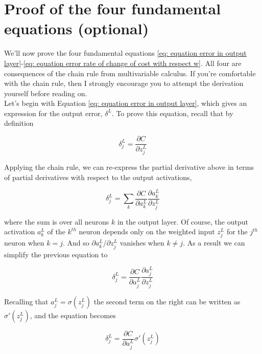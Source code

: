 \section{Proof of the four fundamental equations (optional)}
\label{sec: Proof of the four fundamental equations (optional)}

We'll now prove the four fundamental equations \ref{eq: equation error in output layer}-\ref{eq: equation error rate of change of cost with respect w}. All four are consequences of the chain rule from multivariable calculus. If you're comfortable with the chain rule, then I strongly encourage you to attempt the derivation yourself before reading on.\\

Let's begin with Equation \ref{eq: equation error in output layer}, which gives an expression for the output error, $\delta^L$. To prove this equation, recall that by definition

\begin{equation}
\delta^L_j=\frac{\partial C}{\partial z^L_j}
\label{eq: proof bp1 start definition}
\end{equation}

Applying the chain rule, we can re-express the partial derivative above in terms of partial derivatives with respect to the output activations,

\begin{equation}
\delta^L_j=\sum_k\frac{\partial C}{\partial a^L_k}\frac{\partial a^L_k}{\partial z^L_j}
\label{eq: proof bp1 chain rule}
\end{equation}

where the sum is over all neurons $k$ in the output layer. Of course, the output activation $a^L_k$ of the $k^{th}$ neuron depends only on the weighted input $z^L_j$ for the $j^{th}$ neuron when $k=j$. And so $\partial a^L_k/\partial z^L_j$ vanishes when $k\ne j$. As a result we can simplify the previous equation to

\begin{equation}
\delta^L_j=\frac{\partial C}{\partial a^L_j}\frac{\partial a^L_j}{\partial z^L_j}
\label{eq: proof bp1 chain rule simplified}
\end{equation}

Recalling that $a^L_j=\sigma(z^L_j)$ the second term on the right can be written as $\sigma'(z^L_j)$, and the equation becomes

\begin{equation}
\delta^L_j=\frac{\partial C}{\partial a^L_j}\sigma'(z^L_j)
\label{eq: proof bp1 chain rule simplified with sigma function der}
\end{equation}

